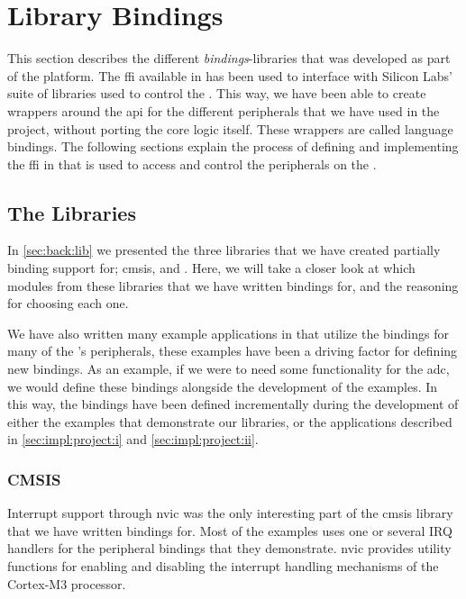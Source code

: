 
\section{Library Bindings}
\label{sub:interfacing_with_emlib}

This section describes the different \emph{bindings}-libraries that was developed as part of the {\rg} platform.
The \gls{ffi} available in {\rust} has been used to interface with Silicon Labs' suite of {\C} libraries used to control the {\gecko}.
This way, we have been able to create wrappers around the \gls{api} for the different peripherals that we have used in the project, without porting the core logic itself.
These wrappers are called language bindings.
The following sections explain the process of defining and implementing the \gls{ffi} in {\rust} that is used to access and control the peripherals on the {\gecko}.

\subsection{The Libraries}
\label{ssub:the_bindings_library}

In \autoref{sec:back:lib} we presented the three libraries that we have created partially binding support for; \gls{cmsis}, {\emlib} and {\emdrv}.
Here, we will take a closer look at which modules from these libraries that we have written bindings for, and the reasoning for choosing each one.

We have also written many example applications in {\rust} that utilize the bindings for many of the {\gecko}'s peripherals, these examples have been a driving factor for defining new bindings.
As an example, if we were to need some functionality for the \gls{adc}, we would define these bindings alongside the development of the examples.
In this way, the bindings have been defined incrementally during the development of either the examples that demonstrate our libraries, or the applications described in \autoref{sec:impl:project:i} and \autoref{sec:impl:project:ii}.

\subsubsection{CMSIS}
\label{sub:cmsis_bindings}

Interrupt support through \gls{nvic} was the only interesting part of the \gls{cmsis} library that we have written bindings for.
Most of the examples uses one or several IRQ handlers for the peripheral bindings that they demonstrate.
\gls{nvic} provides utility functions for enabling and disabling the interrupt handling mechanisms of the Cortex-M3 processor.

